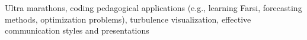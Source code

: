 Ultra marathons, coding pedagogical applications (e.g., learning Farsi, forecasting methods, optimization problems), turbulence visualization, effective communication styles and presentations
